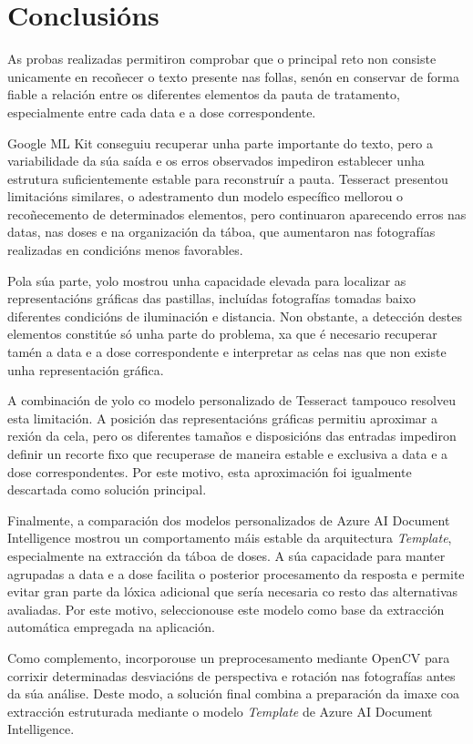 \section{Conclusións}

As probas realizadas permitiron comprobar que o principal reto non consiste unicamente en recoñecer o texto presente nas follas, senón en conservar de forma fiable a relación entre os diferentes elementos da pauta de tratamento, especialmente entre cada data e a dose correspondente.

Google ML Kit conseguiu recuperar unha parte importante do texto, pero a variabilidade da súa saída e os erros observados impediron establecer unha estrutura suficientemente estable para reconstruír a pauta. Tesseract presentou limitacións similares, o adestramento dun modelo específico mellorou o recoñecemento de determinados elementos, pero continuaron aparecendo erros
nas datas, nas doses e na organización da táboa, que aumentaron nas fotografías realizadas en condicións menos favorables.

Pola súa parte, \gls{yolo} mostrou unha capacidade elevada para localizar as representacións gráficas das pastillas, incluídas fotografías tomadas baixo diferentes condicións de iluminación e distancia. Non obstante, a detección destes elementos constitúe só unha parte do problema, xa que é necesario recuperar tamén a data e a dose correspondente e interpretar as celas nas que
non existe unha representación gráfica.

A combinación de \gls{yolo} co modelo personalizado de Tesseract tampouco resolveu esta limitación. A posición das representacións gráficas permitiu aproximar a rexión da cela, pero os diferentes tamaños e disposicións das entradas impediron definir un recorte fixo que recuperase de maneira estable e exclusiva a data e a dose correspondentes. Por este motivo, esta aproximación foi igualmente descartada como solución principal.

Finalmente, a comparación dos modelos personalizados de Azure AI Document Intelligence mostrou un comportamento máis estable da arquitectura \textit{Template}, especialmente na extracción da táboa de doses. A súa capacidade para manter agrupadas a data e a dose facilita o posterior procesamento da resposta e permite evitar gran parte da lóxica adicional que sería necesaria co resto das alternativas avaliadas. Por este motivo, seleccionouse este modelo como base da extracción automática empregada na aplicación.

Como complemento, incorporouse un preprocesamento mediante OpenCV para corrixir determinadas desviacións de perspectiva e rotación nas fotografías antes da súa análise. Deste modo, a solución final combina a preparación da imaxe coa extracción estruturada mediante o modelo \textit{Template} de Azure AI Document Intelligence.

